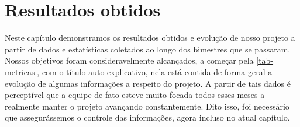 \chapter{Resultados obtidos}
Neste capítulo demonstramos os resultados obtidos e evolução de nosso projeto a partir de dados e estatísticas coletados ao longo dos bimestres que se passaram. Nossos objetivos foram consideravelmente alcançados, a começar pela \autoref{tab-metricas}, com o título auto-explicativo, nela está contida de forma geral a evolução de algumas informações a respeito do projeto. A partir de tais dados é perceptível que a equipe de fato esteve muito focada todos esses meses a realmente manter o projeto avançando constantemente. Dito isso, foi necessário que assegurássemos o controle das informações, agora incluso no atual capítulo.


 



